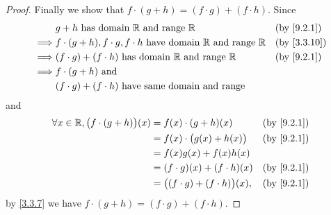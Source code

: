 \begin{proof}
  Finally we show that \(f \cdot (g + h) = (f \cdot g) + (f \cdot h)\).
  Since
  \begin{align*}
             & g + h \text{ has domain } \R \text{ and range } \R                                   &  & \text{(by \cref{9.2.1})}  \\
    \implies & f \cdot (g + h), f \cdot g, f \cdot h  \text{ have domain } \R \text{ and range } \R &  & \text{(by \cref{3.3.10})} \\
    \implies & (f \cdot g) + (f \cdot h)  \text{ has domain } \R \text{ and range } \R              &  & \text{(by \cref{9.2.1})}  \\
    \implies & f \cdot (g + h) \text{ and }                                                                                        \\
             & (f \cdot g) + (f \cdot h) \text{ have same domain and range}
  \end{align*}
  and
  \begin{align*}
    \forall x \in \R, \big(f \cdot (g + h)\big)(x) & = f(x) \cdot (g + h)(x)                   &  & \text{(by \cref{9.2.1})} \\
                                                   & = f(x) \cdot \big(g(x) + h(x)\big)        &  & \text{(by \cref{9.2.1})} \\
                                                   & = f(x)g(x) + f(x)h(x)                                                   \\
                                                   & = (f \cdot g)(x) + (f \cdot h)(x)         &  & \text{(by \cref{9.2.1})} \\
                                                   & = \big((f \cdot g) + (f \cdot h)\big)(x), &  & \text{(by \cref{9.2.1})}
  \end{align*}
  by \cref{3.3.7} we have \(f \cdot (g + h) = (f \cdot g) + (f \cdot h)\).
\end{proof}